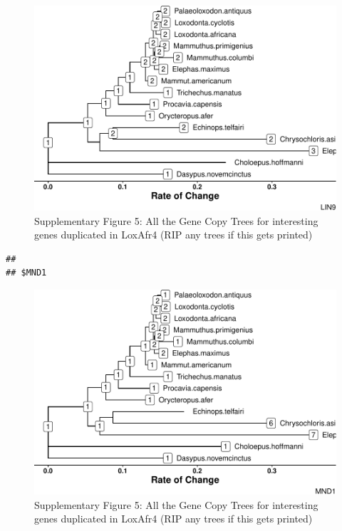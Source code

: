\documentclass[10pt,letterpaper]{article}
\begin{document}
\begin{figure}
\centering
\includegraphics{paper_PLOS_draft_files/figure-latex/Supplementary Figure 5-2.pdf}
\caption{Supplementary Figure 5: All the Gene Copy Trees for interesting
genes duplicated in LoxAfr4 (RIP any trees if this gets printed)}
\end{figure}

\begin{verbatim}
## 
## $MND1
\end{verbatim}

\begin{figure}
\centering
\includegraphics{paper_PLOS_draft_files/figure-latex/Supplementary Figure 5-3.pdf}
\caption{Supplementary Figure 5: All the Gene Copy Trees for interesting
genes duplicated in LoxAfr4 (RIP any trees if this gets printed)}
\end{figure}
\end{document}
